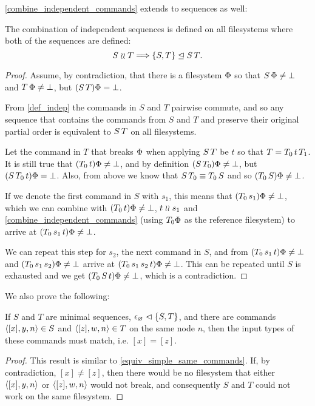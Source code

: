 \cref{combine_independent_commands} extends to sequences as well:

\begin{mylem}
The combination of independent sequences is defined on all filesystems
where both of the sequences are defined:
\[ S\mathrel{\wr\wr} T \Longrightarrow {\{{S,T}\}}\trianglelefteq{S\,T}. \]
\end{mylem}
\begin{proof}
Assume, by contradiction, that there is a filesystem $\Phi$ so that
$S\,\Phi\neq\bot$ and $T\,\Phi\neq\bot$, but
$(S\, T)\Phi=\bot$.

From \cref{def_indep}
the commands in $S$ and $T$ pairwise commute, and so any sequence
that contains the commands from $S$ and $T$ and preserve their original partial order
is equivalent to $S\, T$ on all filesystems.

Let the command in $T$ that breaks $\Phi$ when applying $S\, T$ be $t$
so that $T=T_0\, t\, T_1$.
It is still true that $(T_0 \, t)\Phi\neq\bot$,
and by definition $(S\, T_0)\Phi\neq\bot$,
but $(S\, T_0\, t)\Phi=\bot$.
Also, from above we know that $S\, T_0\equiv T_0\, S$
and so $(T_0 \, S)\Phi\neq\bot$.

If we denote the first command in $S$ with $s_1$,
this means that $(T_0 \, s_1)\Phi\neq\bot$,
which we can combine with $(T_0 \, t)\Phi\neq\bot$, $t\mathrel{\wr\wr} s_1$ and
\cref{combine_independent_commands}
(using $T_0\Phi$ as the reference filesystem)
to arrive at $(T_0 \, s_1\, t)\Phi\neq\bot$.

We can repeat this step for $s_2$, the next command in $S$,
and from 
$(T_0 \, s_1\, t)\Phi\neq\bot$
and
$(T_0 \, s_1\, s_2)\Phi\neq\bot$
arrive at
$(T_0 \, s_1\, s_2\, t)\Phi\neq\bot$.
This can be repeated until $S$ is exhausted and we get
$(T_0 \, S\, t)\Phi\neq\bot$, which is a contradiction.
\end{proof}

We also prove the following:

\begin{mylem}
If $S$ and $T$ are minimal sequences, ${\epsilon_\varnothing}\vartriangleleft{\{{S,T}\}}$,
and there are commands $\langle{[x],y,n}\rangle\in S$ and $\langle{[z],w,n}\rangle\in T$ on the same node $n$,
then the input types of these commands must match, i.e. $[x]=[z]$.
\end{mylem}
\begin{proof}
This result is similar to \cref{equiv_simple_same_commands}.
If, by contradiction, $[x]\neq [z]$, then there would be no filesystem that
either $\langle{[x],y,n}\rangle$ or $\langle{[z],w,n}\rangle$ would not break, 
and consequently $S$ and $T$ could not work on the same filesystem.
\end{proof}

